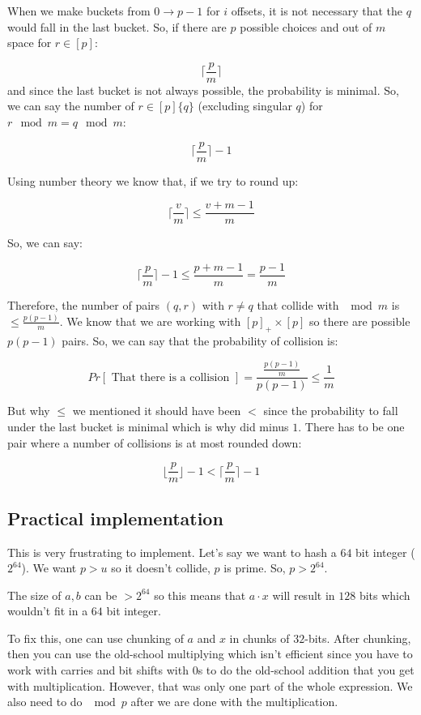 \documentclass{article}
\begin{document}
When we make buckets from $0 \rightarrow p-1$ for $i$ offsets, it is not necessary that the $q$ would fall in the last bucket. So, if there are $p$ possible choices and out of $m$ space for $r \in [p]$:

$$
\lceil\frac{p}{m}\rceil
$$
and since the last bucket is not always possible, the probability is minimal. So, we can say the number of $r \in [p]\{q\}$ (excluding singular $q$) for $r \mod m = q \mod m$:

$$
\lceil\frac{p}{m}\rceil - 1
$$

Using number theory we know that, if we try to round up:

$$
\lceil\frac{v}{m}\rceil \leq \frac{v+m-1}{m}
$$

So, we can say:

$$
\lceil\frac{p}{m}\rceil - 1 \leq \frac{p+m-1}{m} = \frac{p-1}{m}
$$

Therefore, the number of pairs $(q,r)$ with $r\neq q$ that collide with $\mod m$ is $\leq \frac{p(p-1)}{m}$. We know that we are working with ${[p]}_{+} \times [p]$ so there are possible $p(p-1)$ pairs. So, we can say that the probability of collision is:

$$
Pr[\text{ That there is a collision }] = \frac{\frac{p(p-1)}{m}}{p(p-1)} \leq \frac{1}{m}
$$

But why $\leq$ we mentioned it should have been $<$ since the probability to fall under the last bucket is minimal which is why did minus $1$. There has to be one pair where a number of collisions is at most rounded down:

$$
\lfloor\frac{p}{m}\rfloor - 1 < \lceil\frac{p}{m}\rceil - 1
$$

\subsection{Practical implementation}

This is very frustrating to implement. Let's say we want to hash a $64$ bit integer ($2^{64}$). We want $p > u$ so it doesn't collide, $p$ is prime. So, $p > 2^{64}$.

The size of $a,b$ can be $> 2^{64}$ so this means that $a \cdot x$ will result in $128$ bits which wouldn't fit in a $64$ bit integer.

To fix this, one can use chunking of $a$ and $x$ in chunks of $32$-bits. After chunking, then you can use the old-school multiplying which isn't efficient since you have to work with carries and bit shifts with $0$s to do the old-school addition that you get with multiplication. However, that was only one part of the whole expression. We also need to do $\mod p$ after we are done with the multiplication.
\end{document}
